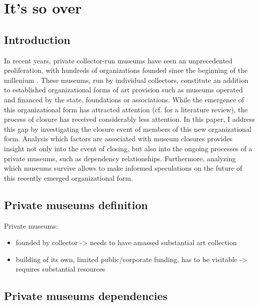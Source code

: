 \documentclass[12pt]{article}
\author{Johannes }
\date{\today}
\title{}
\begin{document}
\section*{It's so over}

\subsection*{Introduction}


In recent years, private collector-run museums have seen an unprecedented proliferation, with hundreds of organizations founded since the beginning of the millenium \parencite{Velthuis_etal_2023_boom,LarrysList_2015_report}.
These museums, run by individual collectors, constitute an addition to established organizational forms of art provision such as museums operated and financed by the state, foundations or associations.
While the emergence of this organizational form has attracted attention (cf. \cite{Kolbe_etal_2022_privatemuseum} for a literature review), the process of closure has received considerably less attention.
In this paper, I address this gap by investigating the closure event of members of this new organizational form.
Analysis which factors are associated with museum closures provides insight not only into the event of closing, but also into the ongoing processes of a private museums, such as dependency relationships.
Furthermore, analyzing which museums survive allows to make informed speculations on the future of this recently emerged organizational form.
\subsection*{Private museums definition}


\bigbreak
\noindent
Private museums:
\begin{itemize}
\item founded by collector -> needs to have amassed substantial art collection
\item building of its own, limited public/corporate funding, has to be visitable -> requires substantial resources
\end{itemize}
\subsection*{Private museums dependencies}
\end{document}
